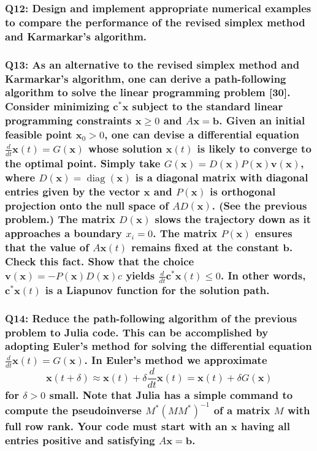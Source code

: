 \documentclass{article}
\begin{document}
\subsubsection*{Q12: Design and implement appropriate numerical examples to compare the performance of the revised simplex method and Karmarkar’s algorithm.}

\subsubsection*{Q13: As an alternative to the revised simplex method and Karmarkar’s algorithm, one can derive a path-following algorithm to solve the linear programming problem [30]. Consider minimizing \(\mathbf{c}^* \mathbf{x}\) subject to the standard linear programming constraints \(\mathbf{x} \geq 0\) and \(A \mathbf{x} = \mathbf{b}\). Given an initial feasible point \(\mathbf{x}_0 > 0\), one can devise a differential equation \(\frac{d}{dt} \mathbf{x}(t) = G(\mathbf{x})\) whose solution \(\mathbf{x}(t)\) is likely to converge to the optimal point. Simply take \(G(\mathbf{x}) = D(\mathbf{x}) P(\mathbf{x}) \mathbf{v}(\mathbf{x})\), where \(D(\mathbf{x}) = \operatorname{diag}(\mathbf{x})\) is a diagonal matrix with diagonal entries given by the vector \(\mathbf{x}\) and \(P(\mathbf{x})\) is orthogonal projection onto the null space of \(A D(\mathbf{x})\). (See the previous problem.) The matrix \(D(\mathbf{x})\) slows the trajectory down as it approaches a boundary \(x_i = 0\). The matrix \(P(\mathbf{x})\) ensures that the value of \(A \mathbf{x}(t)\) remains fixed at the constant \(\mathbf{b}\). Check this fact. Show that the choice \(\mathbf{v}(\mathbf{x}) = -P(\mathbf{x}) D(\mathbf{x}) c\) yields \(\frac{d}{dt} \mathbf{c}^* \mathbf{x}(t) \leq 0\). In other words, \(\mathbf{c}^* \mathbf{x}(t)\) is a Liapunov function for the solution path.}

\subsubsection*{Q14: Reduce the path-following algorithm of the previous problem to Julia code. This can be accomplished by adopting Euler’s method for solving the differential equation \(\frac{d}{dt} \mathbf{x}(t) = G(\mathbf{x})\). In Euler’s method we approximate
\[ \mathbf{x}(t + \delta) \approx \mathbf{x}(t) + \delta \frac{d}{dt} \mathbf{x}(t) = \mathbf{x}(t) + \delta G(\mathbf{x}) \]
for \(\delta > 0\) small. Note that Julia has a simple command to compute the pseudoinverse \(M^* (M M^*)^{-1}\) of a matrix \(M\) with full row rank. Your code must start with an \(\mathbf{x}\) having all entries positive and satisfying \(A \mathbf{x} = \mathbf{b}\).}
\end{document}
